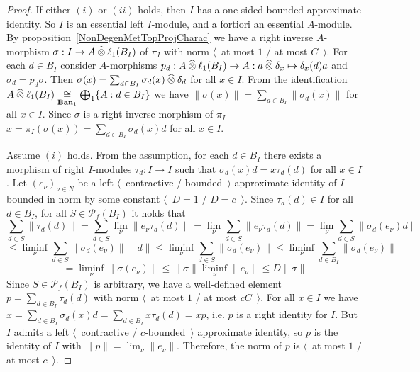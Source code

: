 \begin{proof} If either $(i)$ or $(ii)$ holds, then $I$ has a one-sided bounded
approximate identity. So $I$ is an essential left $I$-module, and a fortiori an
essential $A$-module. By proposition~\ref{NonDegenMetTopProjCharac} we have a
right inverse $A$-morphism $\sigma:I\to A\mathbin{\widehat{\otimes}} \ell_1(B_I)$ of $\pi_I$ with
norm  $\langle$~at most $1$ / at most $C$~$\rangle$. For each $d\in B_I$
consider $A$-morphisms $p_d:A\mathbin{\widehat{\otimes}} \ell_1(B_I)\to A:a\mathbin{\widehat{\otimes}}
\delta_x\mapsto \delta_x(d)a$ and $\sigma_d=p_d\sigma$. Then
$\sigma(x)=\sum_{d\in B_I}\sigma_d(x)\mathbin{\widehat{\otimes}} \delta_d$ for all $x\in I$. From
the identification 
$A\mathbin{\widehat{\otimes}}\ell_1(B_I)\mathrel{\mathop{\cong}\limits_{\mathbf{Ban}_1}}\bigoplus_1 \{A:d\in B_I \}$ 
we have $\lVert\sigma(x)\rVert=\sum_{d\in B_I} \lVert\sigma_d(x)\rVert$ for
all $x\in I$. Since $\sigma$ is a right inverse morphism of $\pi_I$
$x=\pi_I(\sigma(x))=\sum_{d\in B_I}\sigma_d(x)d$ for all $x\in I$. 

Assume $(i)$ holds. From the assumption, for each $d\in B_I$ there exists a morphism
of right $I$-modules $\tau_d:I\to I$ such that $\sigma_d(x)d=x\tau_d(d)$ for all
$x\in I$.  Let ${(e_\nu)}_{\nu\in N}$ be a left $\langle$~contractive /
bounded~$\rangle$ approximate identity of $I$ bounded in norm by some constant
$\langle$~$D=1$ / $D=c$~$\rangle$. Since $\tau_d(d)\in I$ for all $d\in B_I$,
for all $S\in\mathcal{P}_{f}(B_I)$ it holds that
\[
\sum_{d\in S}\lVert \tau_d(d)\rVert
=\sum_{d\in S}\lim_{\nu}\lVert e_\nu \tau_d(d) \rVert
=\lim_{\nu}\sum_{d\in S}\lVert e_\nu \tau_d(d)\rVert
=\lim_{\nu}\sum_{d\in S}\lVert \sigma_d(e_\nu)d \rVert
\]
\[
\leq\liminf_{\nu}\sum_{d\in S}\lVert\sigma_d(e_\nu)\rVert\lVert d\rVert 
\leq\liminf_{\nu}\sum_{d\in S}\lVert\sigma_d(e_\nu)\rVert
\leq\liminf_{\nu}\sum_{d\in B_I}\lVert\sigma_d(e_\nu)\rVert
\]
\[
=\liminf_{\nu}\lVert\sigma(e_\nu)\rVert
\leq\lVert\sigma\rVert\liminf_{\nu}\lVert e_\nu\rVert
\leq D\lVert\sigma\rVert 
\]
Since $S\in \mathcal{P}_{f}(B_I)$ is arbitrary, we have a well-defined element
$p=\sum_{d\in B_I}\tau_d(d)$ with norm $\langle$~at most $1$ / at most
$cC$~$\rangle$. For all $x\in I$ we have $x=\sum_{d\in
B_I}\sigma_d(x)d=\sum_{d\in B_I}x\tau_d(d)=xp$, i.e. $p$ is a right identity for
$I$. But $I$ admits a left $\langle$~contractive / $c$-bounded~$\rangle$
approximate identity, so $p$ is the identity of $I$ with $\lVert
p\rVert=\lim_\nu\lVert e_\nu\rVert$. Therefore, the norm of $p$ is $\langle$~at most
$1$ / at most $c$~$\rangle$.


\end{proof}
